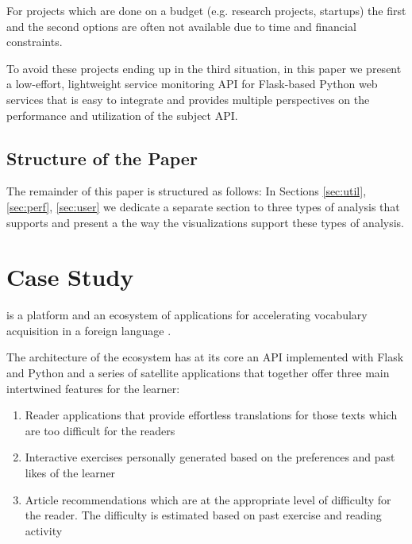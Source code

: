 \documentclass[conference]{IEEEtran}
\begin{document}

For projects which are done on a budget (e.g. research projects, startups) the first and the second options are often not available due to time and financial constraints. 

To avoid these projects ending up in the third situation, in this paper we present a low-effort, lightweight service monitoring API for Flask-based Python web services that is easy to integrate and provides multiple perspectives on the performance and utilization of the subject API.

 

  \subsection* {Structure of the Paper}
    
    The remainder of this paper is structured as follows: In Sections \ref{sec:util}, \ref{sec:perf}, \ref{sec:user} we dedicate a separate section to three types of analysis that \tool supports and present a the way the visualizations support these types of analysis. 



\section{Case Study}

  
  \zee is a platform and an ecosystem of applications for accelerating vocabulary acquisition in a foreign language \cite{Lungu16}. 

  The architecture of the ecosystem has at its core an API implemented with Flask and Python and a series of satellite applications that together offer three main intertwined features for the learner:

  \begin{enumerate}

    \item Reader applications that provide effortless translations for those texts which are too difficult for the readers

    \item Interactive exercises personally generated based on the preferences and past likes of the learner

    \item Article recommendations which are at the appropriate level of difficulty for the reader. The difficulty is estimated based on past exercise and reading activity

  \end{enumerate}
\end{document}
